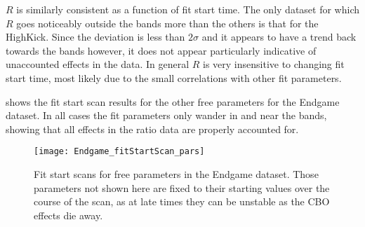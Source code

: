 $R$ is similarly consistent as a function of fit start time. The only dataset for which $R$ goes noticeably outside the bands more than the others is that for the HighKick. Since the deviation is less than $2\sigma$ and it appears to have a trend back towards the bands however, it does not appear particularly indicative of unaccounted effects in the data. In general $R$ is very insensitive to changing fit start time, most likely due to the small correlations with other fit parameters.


 shows the fit start scan results for the other free parameters for the Endgame dataset. In all cases the fit parameters only wander in and near the bands, showing that all effects in the ratio data are properly accounted for.


\begin{figure}[h]
\centering
\texttt{[image: Endgame\_fitStartScan\_pars]}
\caption[Fit start scans for free parameters in the Endgame dataset]{Fit start scans for free parameters in the Endgame dataset. Those parameters not shown here are fixed to their starting values over the course of the scan, as at late times they can be unstable as the CBO effects die away.}
\label{fig:fitStartScan_EndgamePars}
\end{figure}





